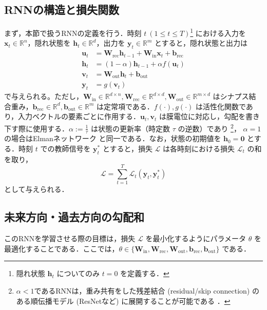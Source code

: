 \documentclass[titlepage]{ltjsbook}
\begin{document}
\subsection{RNNの構造と損失関数}
まず，本節で扱うRNNの定義を行う．時刻 $t\ (1\leq t \leq T)$\footnote{隠れ状態 $\mathbf{h}_t$ についてのみ $t=0$ を定義する．} における入力を $\mathbf{x}_t \in \mathbb{R}^{n}$，隠れ状態を $\mathbf{h}_t \in \mathbb{R}^{d}$，出力を $\mathbf{y}_t \in \mathbb{R}^{m}$ とすると，隠れ状態と出力は
\begin{align}
\mathbf{u}_t &= \mathbf{W}_{\mathrm{rec}}\mathbf{h}_{t-1} + \mathbf{W}_{\mathrm{in}}\mathbf{x}_t + \mathbf{b}_\mathrm{rec}\\
\mathbf{h}_t &= \left(1-\alpha\right)\mathbf{h}_{t-1} + \alpha f(\mathbf{u}_t)\\
\mathbf{v}_t &= \mathbf{W}_{\mathrm{out}}\mathbf{h}_t+ \mathbf{b}_\mathrm{out}\\
\mathbf{y}_t &= g(\mathbf{v}_t)
\end{align}  
で与えられる。ただし，$\mathbf{W}_{\mathrm{in}} \in \mathbb{R}^{d\times n}, \mathbf{W}_{\mathrm{rec}} \in \mathbb{R}^{d\times d}, \mathbf{W}_{\mathrm{out}} \in \mathbb{R}^{m\times d}$ はシナプス結合重み，$\mathbf{b}_\mathrm{rec} \in \mathbb{R}^{d}, \mathbf{b}_\mathrm{out} \in \mathbb{R}^{m}$ は定常項である．$f(\cdot), g(\cdot)$ は活性化関数であり，入力ベクトルの要素ごとに作用する．$\mathbf{u}_t, \mathbf{v}_t$ は膜電位に対応し，勾配を書き下す際に使用する．$\alpha:=\frac{1}{\tau}$ は状態の更新率（時定数 $\tau$ の逆数）であり \footnote{$\alpha < 1$であるRNNは，重み共有をした残差結合 (residual/skip connection) のある順伝播モデル (ResNetなど) に展開することが可能である \citep{liao2016bridging}．}，
$\alpha = 1$ の場合はElmanネットワーク \citep{elman1990finding} と同一である．なお，状態の初期値を $\mathbf{h}_{0}=\mathbf{0}$ とする．時刻 $t$ での教師信号を $\mathbf{y}_t^*$ とすると，損失 $\mathcal{L}$ は各時刻における損失 $\mathcal{L}_t$ の和を取り，
\begin{equation}
\mathcal{L} = \sum_{t=1}^T \mathcal{L}_t\left(\mathbf{y}_t,\mathbf{y}_t^*\right)
\end{equation}  
として与えられる．

\subsection{未来方向・過去方向の勾配和}
このRNNを学習させる際の目標は，損失 $\mathcal{L}$ を最小化するようにパラメータ $\theta$ を最適化することである．ここでは，$\theta \in\{\mathbf{W}_{\mathrm{in}},\mathbf{W}_{\mathrm{rec}},\mathbf{W}_{\mathrm{out}},\mathbf{b}_\mathrm{rec}, \mathbf{b}_\mathrm{out}\}$ である．
\end{document}
